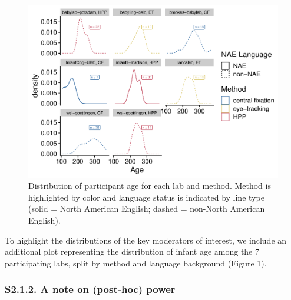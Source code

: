 \documentclass[
  man, donotrepeattitle,floatsintext]{apa6}
\begin{document}
\begin{figure}

{\centering \includegraphics{MB1T_supplement_files/figure-latex/fig1-1} 

}

\caption{Distribution of participant age for each lab and method. Method is highlighted by color and  language status is indicated by line type (solid = North American English; dashed = non-North American English).}\label{fig:fig1}
\end{figure}

To highlight the distributions of the key moderators of interest, we include an additional plot representing the distribution of infant age among the 7 participating labs, split by method and language background (Figure 1).

\hypertarget{s2.1.2.-a-note-on-post-hoc-power}{%
\subsubsection{S2.1.2. A note on (post-hoc) power}\label{s2.1.2.-a-note-on-post-hoc-power}}
\end{document}
